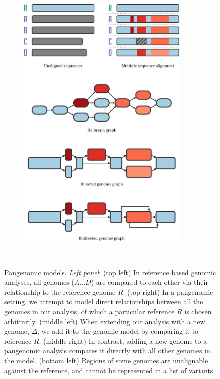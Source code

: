 \begin{figure}[p]
\begin{subfigure}[b]{0.5\textwidth}
    \includegraphics[width=0.9\textwidth]{figures/data_structures.pdf}
    \centering
  \end{subfigure}
  \\
  \caption{
    \label{fig:models}
    Pangenomic models.
    \emph{Left panel}:
    (top left) In reference based genomic analyses, all genomes ($A \ldots D$) are compared to each other via their relationship to the reference genome $R$.
    (top right) In a pangenomic setting, we attempt to model direct relationships between all the genomes in our analysis, of which a particular reference $R$ is chosen arbitrarily.
    (middle left) When extending our analysis with a new genome, $\Delta$, we add it to the genomic model by comparing it to reference $R$.
    (middle right) In contrast, adding a new genome to a pangenomic analysis compares it directly with all other genomes in the model.
    (bottom left) Regions of some genomes are unalignable against the reference, and cannot be represented in a list of variants.
}
\end{figure}
